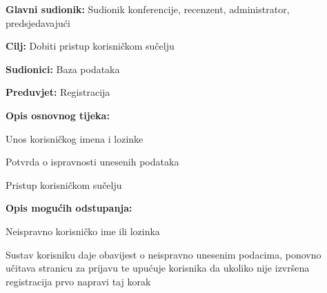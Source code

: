 					\noindent {}
					\begin{packed_item}
	
						\item \textbf{Glavni sudionik: } Sudionik konferencije, recenzent, administrator, predsjedavajući
						\item  \textbf{Cilj:} Dobiti pristup korisničkom sučelju
						\item  \textbf{Sudionici:} Baza podataka
						\item  \textbf{Preduvjet:} Registracija
						\item  \textbf{Opis osnovnog tijeka:}
						
						\item[] \begin{packed_enum}
	
							\item Unos korisničkog imena i lozinke
							\item Potvrda o ispravnosti unesenih podataka
							\item Pristup korisničkom sučelju
					
						\end{packed_enum}

						\item  \textbf{Opis mogućih odstupanja:}
						
						\item[] \begin{packed_item}
	
							\item[2.a]  Neispravno korisničko ime ili lozinka
							\item[] \begin{packed_enum}
								
								\item Sustav korisniku daje obavijest o neispravno unesenim podacima, ponovno učitava stranicu za prijavu te upućuje korisnika da ukoliko nije izvršena registracija prvo napravi taj korak
								
							\end{packed_enum}
							
						\end{packed_item}
			
					\end{packed_item}

